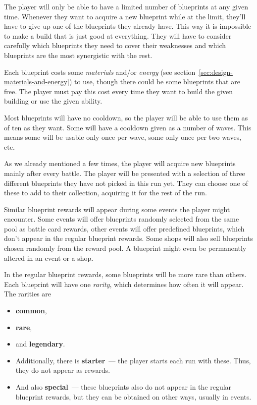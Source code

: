 The player will only be able to have a limited number of blueprints at any given time.
Whenever they want to acquire a new blueprint while at the limit, they'll have to give up one of the blueprints they already have.
This way it is impossible to make a build that is just good at everything.
They will have to consider carefully which blueprints they need to cover their weaknesses and which blueprints are the most synergistic with the rest.

Each blueprint costs some \emph{materials} and/or \emph{energy} (see section~\ref{sec:design-materials-and-energy}) to use, though there could be some blueprints that are free.
The player must pay this cost every time they want to build the given building or use the given ability.

Most blueprints will have no cooldown, so the player will be able to use them as of ten as they want.
Some will have a cooldown given as a number of waves.
This means some will be usable only once per wave, some only once per two waves, etc.

As we already mentioned a few times, the player will acquire new blueprints mainly after every battle.
The player will be presented with a selection of three different blueprints they have not picked in this run yet.
They can choose one of these to add to their collection, acquiring it for the rest of the run.
\begin{notindemo}
    Similar blueprint rewards will appear during some events the player might encounter.
    Some events will offer blueprints randomly selected from the same pool as battle card rewards, other events will offer predefined blueprints, which don't appear in the regular blueprint rewards.
    Some shops will also sell blueprints chosen randomly from the reward pool.
    A blueprint might even be permanently altered in an event or a shop.
\end{notindemo}

In the regular blueprint rewards, some blueprints will be more rare than others.
Each blueprint will have one \emph{rarity}, which determines how often it will appear.
The rarities are
\begin{itemize}
    \item \textbf{common},
    \item \textbf{rare},
    \item and \textbf{legendary}.
    \item Additionally, there is \textbf{starter}~--- the player starts each run with these. Thus, they do not appear as rewards.
    \item And also \textbf{special}~--- these blueprints also do not appear in the regular blueprint rewards, but they can be obtained on other ways, usually in events.
\end{itemize}

